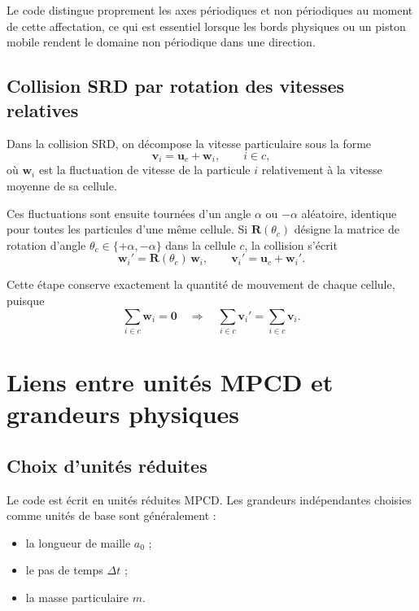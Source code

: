 \documentclass[11pt,a4paper]{article}
\begin{document}
Le code distingue proprement les axes périodiques et non périodiques au moment de cette affectation, ce qui est essentiel lorsque les bords physiques ou un piston mobile rendent le domaine non périodique dans une direction.

\subsection{Collision SRD par rotation des vitesses relatives}

Dans la collision SRD, on décompose la vitesse particulaire sous la forme
\begin{equation}
 \bm{v}_i = \bm{u}_c + \bm{w}_i,
 \qquad i\in c,
\end{equation}
où $\bm{w}_i$ est la fluctuation de vitesse de la particule $i$ relativement à la vitesse moyenne de sa cellule.

Ces fluctuations sont ensuite tournées d'un angle $\alpha$ ou $-\alpha$ aléatoire, identique pour toutes les particules d'une même cellule. Si $\mathbf{R}(\theta_c)$ désigne la matrice de rotation d'angle $\theta_c\in\{+\alpha,-\alpha\}$ dans la cellule $c$, la collision s'écrit
\begin{equation}
 \bm{w}_i' = \mathbf{R}(\theta_c)\,\bm{w}_i,
 \qquad
 \bm{v}_i' = \bm{u}_c + \bm{w}_i'.
\end{equation}

Cette étape conserve exactement la quantité de mouvement de chaque cellule, puisque
\begin{equation}
 \sum_{i\in c} \bm{w}_i = \bm{0}
 \quad \Longrightarrow \quad
 \sum_{i\in c} \bm{v}_i' = \sum_{i\in c} \bm{v}_i.
\end{equation}

\section{Liens entre unités MPCD et grandeurs physiques}

\subsection{Choix d'unités réduites}

Le code est écrit en unités réduites MPCD. Les grandeurs indépendantes choisies comme unités de base sont généralement :
\begin{itemize}
  \item la longueur de maille $a_0$ ;
  \item le pas de temps $\Delta t$ ;
  \item la masse particulaire $m$.
\end{itemize}
\end{document}
